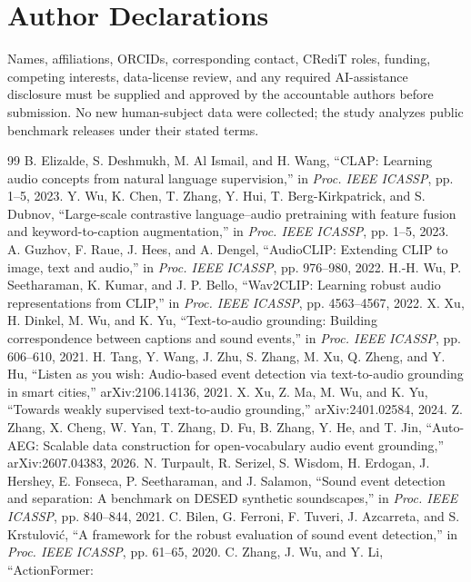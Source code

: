 \documentclass[journal,10pt]{IEEEtran}
\begin{document}
\section*{Author Declarations}
Names, affiliations, ORCIDs, corresponding contact, CRediT roles, funding,
competing interests, data-license review, and any required AI-assistance
disclosure must be supplied and approved by the accountable authors before
submission. No new human-subject data were collected; the study analyzes
public benchmark releases under their stated terms.

\begin{thebibliography}{99}
 B. Elizalde, S. Deshmukh, M. Al Ismail, and H. Wang,
``CLAP: Learning audio concepts from natural language supervision,''
in \emph{Proc. IEEE ICASSP}, pp. 1--5, 2023.
 Y. Wu, K. Chen, T. Zhang, Y. Hui,
T. Berg-Kirkpatrick, and S. Dubnov, ``Large-scale contrastive
language--audio pretraining with feature fusion and keyword-to-caption
augmentation,'' in \emph{Proc. IEEE ICASSP}, pp. 1--5, 2023.
 A. Guzhov, F. Raue, J. Hees, and A. Dengel,
``AudioCLIP: Extending CLIP to image, text and audio,''
in \emph{Proc. IEEE ICASSP}, pp. 976--980, 2022.
 H.-H. Wu, P. Seetharaman, K. Kumar, and J. P. Bello,
``Wav2CLIP: Learning robust audio representations from CLIP,''
in \emph{Proc. IEEE ICASSP}, pp. 4563--4567, 2022.
 X. Xu, H. Dinkel, M. Wu, and K. Yu, ``Text-to-audio grounding:
Building correspondence between captions and sound events,''
in \emph{Proc. IEEE ICASSP}, pp. 606--610, 2021.
 H. Tang, Y. Wang, J. Zhu, S. Zhang, M. Xu, Q. Zheng, and
Y. Hu, ``Listen as you wish: Audio-based event detection via text-to-audio
grounding in smart cities,'' arXiv:2106.14136, 2021.
 X. Xu, Z. Ma, M. Wu, and K. Yu, ``Towards weakly supervised
text-to-audio grounding,'' arXiv:2401.02584, 2024.
 Z. Zhang, X. Cheng, W. Yan, T. Zhang, D. Fu, B. Zhang,
Y. He, and T. Jin, ``Auto-AEG: Scalable data construction for open-vocabulary
audio event grounding,'' arXiv:2607.04383, 2026.
 N. Turpault, R. Serizel, S. Wisdom, H. Erdogan,
J. Hershey, E. Fonseca, P. Seetharaman, and J. Salamon, ``Sound event
detection and separation: A benchmark on DESED synthetic soundscapes,''
in \emph{Proc. IEEE ICASSP}, pp. 840--844, 2021.
 C. Bilen, G. Ferroni, F. Tuveri, J. Azcarreta, and
S. Krstulovi\'c, ``A framework for the robust evaluation of sound event
detection,'' in \emph{Proc. IEEE ICASSP}, pp. 61--65, 2020.
 C. Zhang, J. Wu, and Y. Li, ``ActionFormer:

\end{thebibliography}
\end{document}
